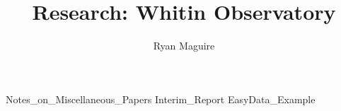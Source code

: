 \documentclass[crop=false,class=book,oneside]{standalone}
\begin{document}
    \newif\ifresearchwhitinobservatory
    \ifx\ifresearch\undefined
        \title{Research: Whitin Observatory}
        \author{Ryan Maguire}
        \date{\vspace{-5ex}}
        \maketitle
        \tableofcontents
        \listoffigures
        \listoftables
        \clearpage
    \fi
    {Notes_on_Miscellaneous_Papers}
    {Interim_Report}
    {EasyData_Example}
    \ifx\ifresearch\undefined
        
    \fi
\end{document}
